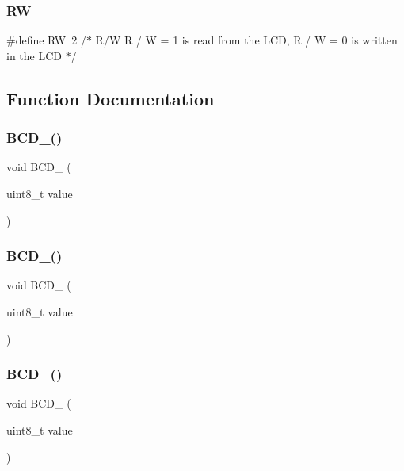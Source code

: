 \mbox{\label{lcd_8h_afc4ded33ac0ca43defcce639e965748a}} 
\subsubsection{RW}
{\footnotesize\ttfamily \#define RW~2   	/$\ast$ R/W		R / W = 1 is read from the L\+CD, R / W = 0 is written in the L\+CD		$\ast$/}



\subsection{Function Documentation}
\mbox{\label{lcd_8h_a96dad2021433be8a2a64085cfa4132b0}} 
\subsubsection{B\+C\+D\+\_()}
{\footnotesize\ttfamily void B\+C\+D\+\_ (\begin{DoxyParamCaption}\item[{uint8\+\_\+t}]{value }\end{DoxyParamCaption})}

\mbox{\label{lcd_8h_a5d6d939f94e00c827e9be235c12e458f}} 
\subsubsection{B\+C\+D\+\_()}
{\footnotesize\ttfamily void B\+C\+D\+\_ (\begin{DoxyParamCaption}\item[{uint8\+\_\+t}]{value }\end{DoxyParamCaption})}

\mbox{\label{lcd_8h_ab69e11ffc7dd32db82ce7c6f6572b03c}} 
\subsubsection{B\+C\+D\+\_()}
{\footnotesize\ttfamily void B\+C\+D\+\_ (\begin{DoxyParamCaption}\item[{uint8\+\_\+t}]{value }\end{DoxyParamCaption})}

